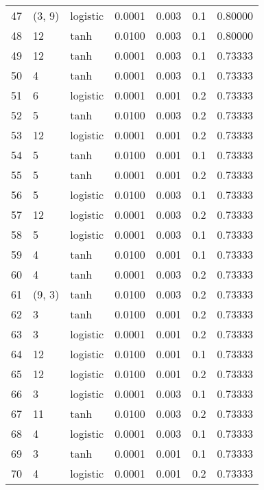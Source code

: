 \begin{tabular}{lllrrrr}
47  &      (3, 9) &  logistic &  0.0001 &  0.003 &  0.1 &   0.80000 \\
48  &          12 &      tanh &  0.0100 &  0.003 &  0.1 &   0.80000 \\
49  &          12 &      tanh &  0.0001 &  0.003 &  0.1 &   0.73333 \\
50  &           4 &      tanh &  0.0001 &  0.003 &  0.1 &   0.73333 \\
51  &           6 &  logistic &  0.0001 &  0.001 &  0.2 &   0.73333 \\
52  &           5 &      tanh &  0.0100 &  0.003 &  0.2 &   0.73333 \\
53  &          12 &  logistic &  0.0001 &  0.001 &  0.2 &   0.73333 \\
54  &           5 &      tanh &  0.0100 &  0.001 &  0.1 &   0.73333 \\
55  &           5 &      tanh &  0.0001 &  0.001 &  0.2 &   0.73333 \\
56  &           5 &  logistic &  0.0100 &  0.003 &  0.1 &   0.73333 \\
57  &          12 &  logistic &  0.0001 &  0.003 &  0.2 &   0.73333 \\
58  &           5 &  logistic &  0.0001 &  0.003 &  0.1 &   0.73333 \\
59  &           4 &      tanh &  0.0100 &  0.001 &  0.1 &   0.73333 \\
60  &           4 &      tanh &  0.0001 &  0.003 &  0.2 &   0.73333 \\
61  &      (9, 3) &      tanh &  0.0100 &  0.003 &  0.2 &   0.73333 \\
62  &           3 &      tanh &  0.0100 &  0.001 &  0.2 &   0.73333 \\
63  &           3 &  logistic &  0.0001 &  0.001 &  0.2 &   0.73333 \\
64  &          12 &  logistic &  0.0100 &  0.001 &  0.1 &   0.73333 \\
65  &          12 &  logistic &  0.0100 &  0.001 &  0.2 &   0.73333 \\
66  &           3 &  logistic &  0.0001 &  0.003 &  0.1 &   0.73333 \\
67  &          11 &      tanh &  0.0100 &  0.003 &  0.2 &   0.73333 \\
68  &           4 &  logistic &  0.0001 &  0.003 &  0.1 &   0.73333 \\
69  &           3 &      tanh &  0.0001 &  0.001 &  0.1 &   0.73333 \\
70  &           4 &  logistic &  0.0001 &  0.001 &  0.2 &   0.73333 \\

\end{tabular}
